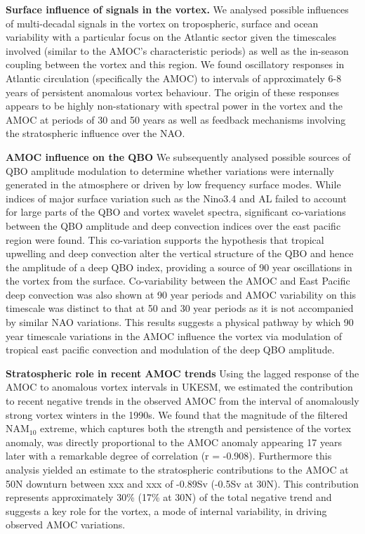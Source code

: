 \textbf{Surface influence of signals in the vortex.}
We analysed possible influences of multi-decadal signals in the vortex on tropospheric, surface and ocean variability with a particular focus on the Atlantic sector given the timescales involved (similar to the AMOC's characteristic periods) as well as the in-season coupling between the vortex and this region. We found oscillatory responses in Atlantic circulation (specifically the AMOC) to intervals of approximately 6-8 years of persistent anomalous vortex behaviour. The origin of these responses appears to be highly non-stationary with spectral power in the vortex and the AMOC at periods of 30 and 50 years as well as feedback mechanisms involving the stratospheric influence over the NAO. 

\textbf{AMOC influence on the QBO}
We subsequently analysed possible sources of QBO amplitude modulation to determine whether variations were internally generated in the atmosphere or driven by low frequency surface modes. While indices of major surface variation such as the Nino3.4 and AL failed to account for large parts of the QBO and vortex wavelet spectra, significant co-variations between the QBO amplitude and deep convection indices over the east pacific region were found. This co-variation supports the hypothesis that tropical upwelling and deep convection alter the vertical structure of the QBO and hence the amplitude of a deep QBO index, providing a source of 90 year oscillations in the vortex from the surface. Co-variability between the AMOC and East Pacific deep convection was also shown at 90 year periods and AMOC variability on this timescale was distinct to that at 50 and 30 year periods as it is not accompanied by similar NAO variations. This results suggests a physical pathway by which 90 year timescale variations in the AMOC influence the vortex via modulation of tropical east pacific convection and modulation of the deep QBO amplitude. 

\textbf{Stratospheric role in recent AMOC trends}
Using the lagged response of the AMOC to anomalous vortex intervals in UKESM, we estimated the contribution to recent negative trends in the observed AMOC from the interval of anomalously strong vortex winters in the 1990s. We found that the magnitude of the filtered NAM$_{10}$ extreme, which captures both the strength and persistence of the vortex anomaly, was directly proportional to the AMOC anomaly appearing 17 years later with a remarkable degree of correlation (r = -0.908). Furthermore this analysis yielded an estimate to the stratospheric contributions to the AMOC at 50N downturn between xxx and xxx of -0.89Sv (-0.5Sv at 30N). This contribution represents approximately 30\% (17\% at 30N) of the total negative trend and suggests a key role for the vortex, a mode of internal variability, in driving observed AMOC variations. 

